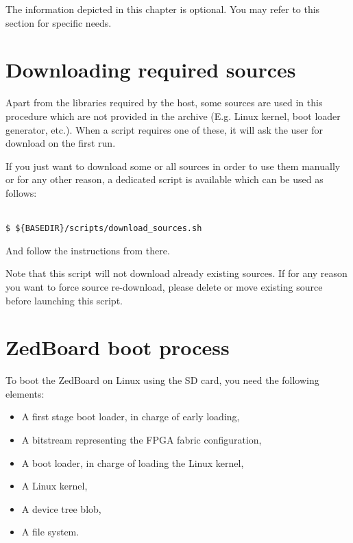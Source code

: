 \documentclass[openany,a4paper]{book}
\begin{document}
The information depicted in this chapter is optional.
You may refer to this section for specific needs.


\section{Downloading required sources}

Apart from the libraries required by the host, some sources are used in this procedure which are not provided in the archive (E.g. Linux kernel, boot loader generator, etc.).
When a script requires one of these, it will ask the user for download on the first run.

If you just want to download some or all sources in order to use them manually or for any other reason, a dedicated script is available which can be used as follows:

\begin{tabbing}
\kill \hspace{1cm} \= \\
\> \texttt{\$ \$\{BASEDIR\}/scripts/download\_sources.sh}\\
\end{tabbing}

And follow the instructions from there.

Note that this script will not download already existing sources.
If for any reason you want to force source re-download, please delete or move existing source before launching this script.


\section{ZedBoard boot process}

To boot the ZedBoard on Linux using the SD card, you need the following elements:

\begin{itemize}
 \item A first stage boot loader, in charge of early loading,
 \item A bitstream representing the FPGA fabric configuration,
 \item A boot loader, in charge of loading the Linux kernel,
 \item A Linux kernel,
 \item A device tree blob,
 \item A file system.
\end{itemize}
\end{document}

